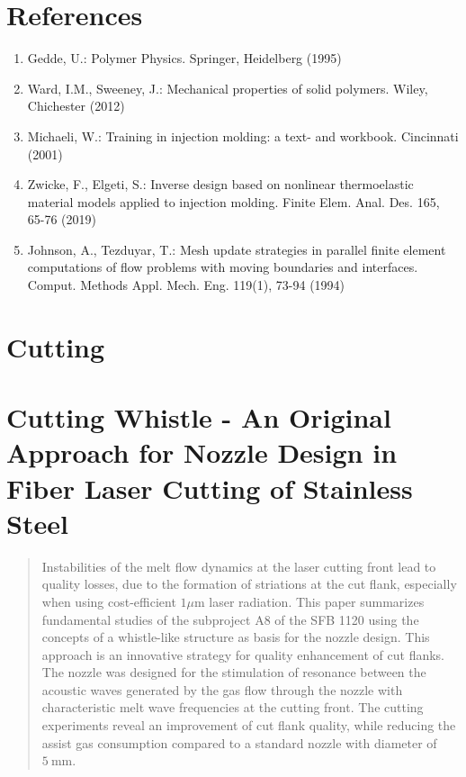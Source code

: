 \documentclass[10pt]{article}
\begin{document}
\section*{References}
\begin{enumerate}
  \item Gedde, U.: Polymer Physics. Springer, Heidelberg (1995)

  \item Ward, I.M., Sweeney, J.: Mechanical properties of solid polymers. Wiley, Chichester (2012)

  \item Michaeli, W.: Training in injection molding: a text- and workbook. Cincinnati (2001)

  \item Zwicke, F., Elgeti, S.: Inverse design based on nonlinear thermoelastic material models applied to injection molding. Finite Elem. Anal. Des. 165, 65-76 (2019)

  \item Johnson, A., Tezduyar, T.: Mesh update strategies in parallel finite element computations of flow problems with moving boundaries and interfaces. Comput. Methods Appl. Mech. Eng. 119(1), 73-94 (1994)

\end{enumerate}

\section*{Cutting}
\section*{Cutting Whistle - An Original Approach for Nozzle Design in Fiber Laser Cutting of Stainless Steel }


\begin{abstract}
Instabilities of the melt flow dynamics at the laser cutting front lead to quality losses, due to the formation of striations at the cut flank, especially when using cost-efficient $1 \mu \mathrm{m}$ laser radiation. This paper summarizes fundamental studies of the subproject A8 of the SFB 1120 using the concepts of a whistle-like structure as basis for the nozzle design. This approach is an innovative strategy for quality enhancement of cut flanks. The nozzle was designed for the stimulation of resonance between the acoustic waves generated by the gas flow through the nozzle with characteristic melt wave frequencies at the cutting front. The cutting experiments reveal an improvement of cut flank quality, while reducing the assist gas consumption compared to a standard nozzle with diameter of $5 \mathrm{~mm}$.
\end{abstract}
\end{document}
